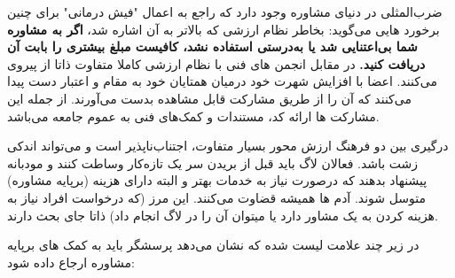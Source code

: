 ضرب‌المثلی در دنیای مشاوره وجود دارد که راجع به اعمال "فیش درمانی"
برای چنین برخورد هایی می‌گوید: بخاطر نظام ارزشی که بالاتر به آن اشاره شد،
{\bfseries
اگر به مشاوره شما بی‌اعتنایی شد یا به‌درستی استفاده نشد، کافیست
مبلغ بیشتری را بابت آن دریافت کنید.
}
در مقابل انجمن های فنی با نظام ارزشی کاملا متفاوت
ذاتا از
پیروی می‌کنند.
اعضا با افزایش شهرت خود درمیان همتایان خود به مقام و اعتبار
دست پیدا می‌کنند که آن را از طریق مشارکت قابل مشاهده بدست می‌آورند.
از جمله این مشارکت ها ارائه کد، مستندات و کمک‌های فنی به عموم جامعه می‌باشد.

درگیری بین دو فرهنگ ارزش محور بسیار متفاوت، اجتناب‌ناپذیر است
و می‌تواند اندکی زشت باشد.
فعالان لاگ باید قبل از بریدن سر یک تازه‌کار وساطت کنند
و مودبانه پیشنهاد بدهند که درصورت نیاز به خدمات بهتر
و البته دارای هزینه (برپایه مشاوره) متوسل شوند.
آدم ها همیشه قضاوت می‌کنند. این مرز (که درخواست افراد
نیاز به هزینه کردن به یک مشاور دارد یا میتوان آن را در
لاگ انجام داد) ذاتا جای بحث دارند.

در زیر چند علامت لیست شده که نشان می‌دهد پرسشگر باید به
کمک های برپایه مشاوره ارجاع داده شود:

